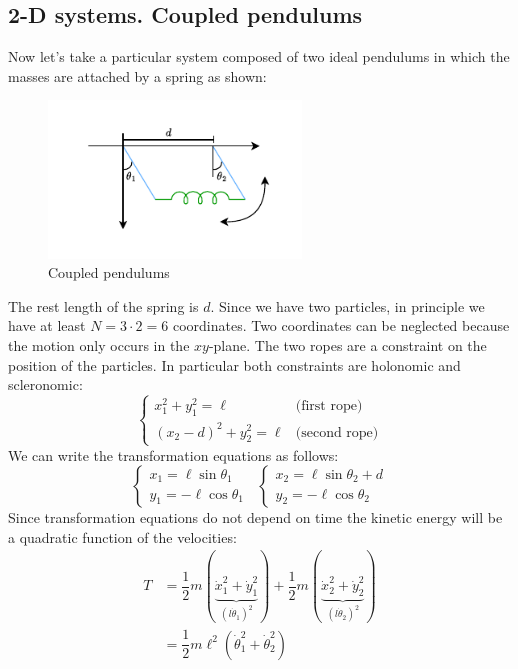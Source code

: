 \subsection{2-D systems. Coupled pendulums}
Now let's take a particular system composed of two ideal pendulums in which the masses are attached by a spring as shown:
\begin{figure}[H]
    \centering
    \includegraphics[width=0.6\textwidth]{res/svg/couple_pendulum_1.drawio}
    \caption{Coupled pendulums}
\end{figure}
The rest length of the spring is $d$. Since we have two particles, in principle we have at least $N=3\cdot2=6$ coordinates. Two coordinates can be neglected because the motion only occurs in the $xy$-plane.
The two ropes are a constraint on the position of the particles. In particular both constraints are holonomic and scleronomic:
\begin{equation}
    \begin{cases}
        x_1^2 + y_1^2 = \ell & \text{(first rope)}\\[8pt]
        (x_2-d)^2 + y_2^2 = \ell & \text{(second rope)}
    \end{cases}
\end{equation}
We can write the transformation equations as follows:
\begin{equation}
    \begin{cases}
        x_1 = \ell\sin\theta_1\\[8pt]
        y_1 = -\ell\cos\theta_1
    \end{cases}\;\;
    \begin{cases}
        x_2 = \ell\sin\theta_2+d\\[8pt]
        y_2 = -\ell\cos\theta_2
    \end{cases}
\end{equation}
Since transformation equations do not depend on time the kinetic energy will be a quadratic function of the velocities:
\begin{equation}
    \begin{split}
        T &= \dfrac{1}{2}m(\underbrace{\dot{x}_1^2+\dot{y}_1^2}_{(l\dot{\theta}_1)^2}) + \dfrac{1}{2}m(\underbrace{\dot{x}_2^2+\dot{y}_2^2}_{(l\dot{\theta}_2)^2}) \\[8pt]
        &= \dfrac{1}{2}m\ell^2(\dot{\theta}_1^2+\dot{\theta}_2^2)
    \end{split}
\end{equation}
